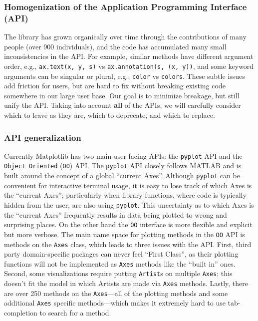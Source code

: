 \documentclass[11pt,letterpaper]{article}  %
\begin{document}

\subsubsection{Homogenization of the Application Programming Interface (API)}
\label{sec:api_hom}
The library has grown organically over time through the contributions
of many people (over 900 individuals), and the code has accumulated
many small inconsistencies in the API.  For example, similar methods have different
argument order, e.g., \texttt{ax.text(x, y, s)} vs
\texttt{ax.annotation(s, (x, y))}, and some keyword arguments can be
singular or plural, e.g., \texttt{color} vs \texttt{colors}.  These
subtle issues add friction for users, but are hard to fix without
breaking existing code somewhere in our large user base.  Our goal is
to minimize breakage, but still unify the API.  Taking into account
\textbf{all} of the APIs, we will carefully consider which to leave as
they are, which to deprecate, and which to replace.

\subsubsection{API generalization}
\label{sec:api_gen}
Currently Matplotlib has two main user-facing APIs: the
\texttt{pyplot} API and the \texttt{Object Oriented} (\texttt{OO})
API.  The \texttt{pyplot} API closely follows MATLAB and is built
around the concept of a global ``current Axes''.
Although \texttt{pyplot} can be convenient for interactive terminal
usage, it is easy to lose track of which Axes is the ``current Axes'';
particularly when library functions, where code is typically hidden
from the user, are also using \texttt{pyplot}.
This uncertainty as to
which Axes is the ``current Axes'' frequently results in data being
plotted to wrong and surprising places.
On the other hand the \texttt{OO} interface is more flexible and
explicit but more verbose.
The main name space for plotting methods in the \texttt{OO} API is
methods on the \texttt{Axes} class, which leads to three issues with
the API.
First, third party domain-specific packages can never feel ``First
Class'', as their plotting functions will not be implemented as
\texttt{Axes} methods like the ``built in'' ones.
Second, some visualizations require putting \texttt{Artist}s on
multiple \texttt{Axes}; this doesn't fit the model in which Artists
are made via \texttt{Axes} methods.
Lastly, there are over 250 methods on the \texttt{Axes}---all of the
plotting methods and some additional \texttt{Axes} specific
methods---which makes it extremely hard to use tab-completion to
search for a method.
\end{document}
